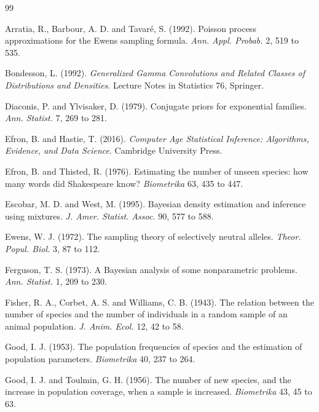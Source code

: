 \begin{thebibliography}{99}

Arratia, R., Barbour, A. D. and Tavar\'e, S. (1992). Poisson process approximations for the Ewens sampling formula. \emph{Ann. Appl. Probab.} 2, 519 to 535.

Bondesson, L. (1992). \emph{Generalized Gamma Convolutions and Related Classes of Distributions and Densities}. Lecture Notes in Statistics 76, Springer.

Diaconis, P. and Ylvisaker, D. (1979). Conjugate priors for exponential families. \emph{Ann. Statist.} 7, 269 to 281.

Efron, B. and Hastie, T. (2016). \emph{Computer Age Statistical Inference: Algorithms, Evidence, and Data Science}. Cambridge University Press.

Efron, B. and Thisted, R. (1976). Estimating the number of unseen species: how many words did Shakespeare know? \emph{Biometrika} 63, 435 to 447.

Escobar, M. D. and West, M. (1995). Bayesian density estimation and inference using mixtures. \emph{J. Amer. Statist. Assoc.} 90, 577 to 588.

Ewens, W. J. (1972). The sampling theory of selectively neutral alleles. \emph{Theor. Popul. Biol.} 3, 87 to 112.

Ferguson, T. S. (1973). A Bayesian analysis of some nonparametric problems. \emph{Ann. Statist.} 1, 209 to 230.

Fisher, R. A., Corbet, A. S. and Williams, C. B. (1943). The relation between the number of species and the number of individuals in a random sample of an animal population. \emph{J. Anim. Ecol.} 12, 42 to 58.

Good, I. J. (1953). The population frequencies of species and the estimation of population parameters. \emph{Biometrika} 40, 237 to 264.

Good, I. J. and Toulmin, G. H. (1956). The number of new species, and the increase in population coverage, when a sample is increased. \emph{Biometrika} 43, 45 to 63.


\end{thebibliography}
